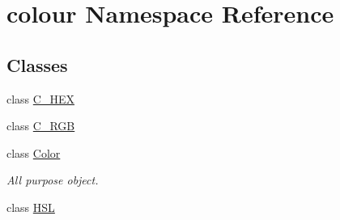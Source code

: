 \hypertarget{namespacecolour}{}\section{colour Namespace Reference}
\label{namespacecolour}
\subsection*{Classes}
\begin{DoxyCompactItemize}
\item 
class \hyperlink{classcolour_1_1C__HEX}{C\+\_\+\+H\+E\+X}
\item 
class \hyperlink{classcolour_1_1C__RGB}{C\+\_\+\+R\+G\+B}
\item 
class \hyperlink{classcolour_1_1Color}{Color}
\begin{DoxyCompactList}\small\item\em All purpose object. \end{DoxyCompactList}\item 
class \hyperlink{classcolour_1_1HSL}{H\+S\+L}
\end{DoxyCompactItemize}
